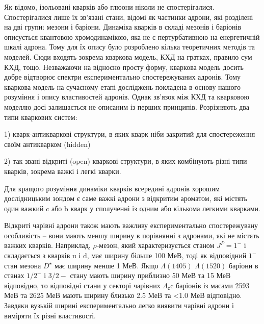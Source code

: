Як відомо, ізольовані кварків або глюони ніколи не спостерігалися. Спостерігалися лише їх зв’язані стани, відомі як частинки адрони, які розділені на дві групи: мезони і баріони. Динаміка кварків в складі мезонів і баріонів описується квантовою хромодинамікою, яка не є пертурбативною на енергетичній шкалі адрона. Тому для їх опису було розроблено кілька теоретичних методів та моделей. Сюди входять зокрема кваркова модель,  КХД на гратках, правило сум КХД, тощо. Незважаючи на відносно просту форму, кваркова модель досить добре відтворює спектри експериментально спостережуваних адронів. Тому кваркова модель на сучасному етапі досліджень покладена в основу нашого розуміння і опису властивостей  адронів. Однак зв'язок між КХД та кварковою моделлю досі залишається не описаним із перших принципів. Розрізняють два типи кваркових систем: 

1) кварк-антикваркові структури, в яких кварк ніби закритий для спостереження своїм антикварком (hidden) 

2) так звані відкриті (open) кваркові структури, в яких комбінують різні типи кварків, зокрема важкі і легкі кварки. 

Для кращого розуміння динаміки кварків всередині адронів хорошим дослідницьким зондом є саме важкі адрони з відкритим ароматом, які містять один важкий c або b кварк у сполученні із одним або кількома легкими кварками.

Відкриті чарівні адрони також мають важливу експериментально спостережувану особливість -- вони мають меншу ширину в порівнянні з адронами, які не містять важких кварків. Наприклад, $\rho$-мезон, який характеризується станом $J^P = 1^{-}$ і складається з кварків u і d, має ширину більше 100 МеВ, тоді як відповідний $1^{-}$ стан мезона $D^{\star}$ має ширину менше 1 МеВ. Якщо $\Lambda(1405)$ $\Lambda(1520)$ баріони в станах $1/2^{-}$ і $3/2{-}$ стану мають ширину приблизно 50 МеВ та 15 МеВ відповідно, то відповідні стани у секторі чарівних $\Lambda_{с}$c баріонів із масами 2593 МеВ та 2625 МеВ  мають ширину близько 2.5 МеВ та <1.0 МеВ відповідно. Завдяки вузькій ширині експериментально легко виявити чарівні адрони і виміряти їх різні властивості.
